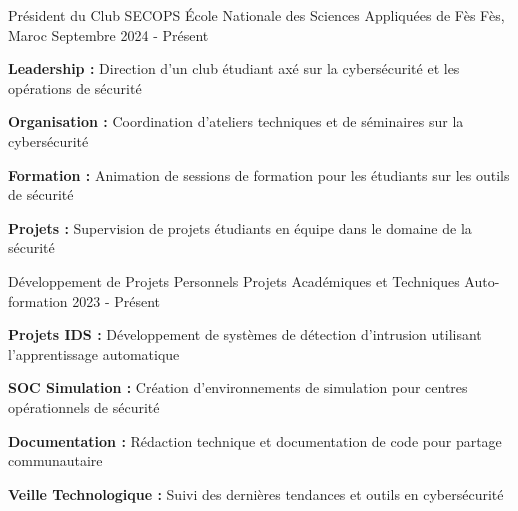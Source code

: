 
\begin{cventries}

    \cventry
    {Président du Club SECOPS}
    {École Nationale des Sciences Appliquées de Fès} %
    {Fès, Maroc} %
    {Septembre 2024 - Présent} %
    {
        \begin{cvitems} %
            \item {\textbf{Leadership :} Direction d'un club étudiant axé sur la cybersécurité et les opérations de sécurité}
            \item {\textbf{Organisation :} Coordination d'ateliers techniques et de séminaires sur la cybersécurité}
            \item {\textbf{Formation :} Animation de sessions de formation pour les étudiants sur les outils de sécurité}
            \item {\textbf{Projets :} Supervision de projets étudiants en équipe dans le domaine de la sécurité}
        \end{cvitems}
    }

    \cventry
    {Développement de Projets Personnels}
    {Projets Académiques et Techniques} %
    {Auto-formation} %
    {2023 - Présent} %
    {
        \begin{cvitems} %
            \item {\textbf{Projets IDS :} Développement de systèmes de détection d'intrusion utilisant l'apprentissage automatique}
            \item {\textbf{SOC Simulation :} Création d'environnements de simulation pour centres opérationnels de sécurité}
            \item {\textbf{Documentation :} Rédaction technique et documentation de code pour partage communautaire}
            \item {\textbf{Veille Technologique :} Suivi des dernières tendances et outils en cybersécurité}
        \end{cvitems}
    }

\end{cventries}
